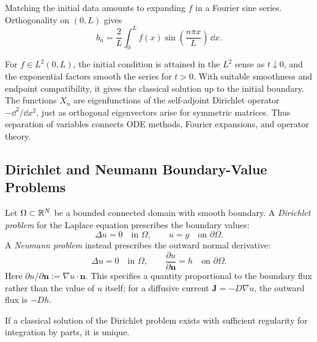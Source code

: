 \begin{example}
Matching the initial data amounts to expanding $f$ in a Fourier sine series. Orthogonality on $(0,L)$ gives
\begin{equation}
b_n=\frac{2}{L}\int_0^L f(x)\sin\left(\frac{n\pi x}{L}\right)\,\dd x.
\end{equation}

For $f\in L^2(0,L)$, the initial condition is attained in the $L^2$ sense as $t\downarrow0$, and the exponential factors smooth the series for $t>0$. With suitable smoothness and endpoint compatibility, it gives the classical solution up to the initial boundary. The functions $X_n$ are eigenfunctions of the self-adjoint Dirichlet operator $-\dd^2/\dd x^2$, just as orthogonal eigenvectors arise for symmetric matrices. Thus separation of variables connects ODE methods, Fourier expansions, and operator theory.
\end{example}



\subsection{Dirichlet and Neumann Boundary-Value Problems}
\label{sec:pde-boundary-problems}

\begin{definition}
Let $\Omega\subset\mathbb{R}^N$ be a bounded connected domain with smooth boundary. A \emph{Dirichlet problem} for the Laplace equation prescribes the boundary values:
\begin{equation}
\Delta u=0\quad\text{in }\Omega,\qquad u=g\quad\text{on }\partial\Omega.
\end{equation}
A \emph{Neumann problem} instead prescribes the outward normal derivative:
\begin{equation}
\Delta u=0\quad\text{in }\Omega,\qquad
\frac{\partial u}{\partial\mathbf{n}}=h\quad\text{on }\partial\Omega.
\end{equation}
Here $\partial u/\partial\mathbf{n}:=\nabla u\cdot\mathbf{n}$. This specifies a quantity proportional to the boundary flux rather than the value of $u$ itself; for a diffusive current $\mathbf{J}=-D\nabla u$, the outward flux is $-D h$.
\end{definition}

\begin{theorem}
If a classical solution of the Dirichlet problem exists with sufficient regularity for integration by parts, it is unique.
\end{theorem}

